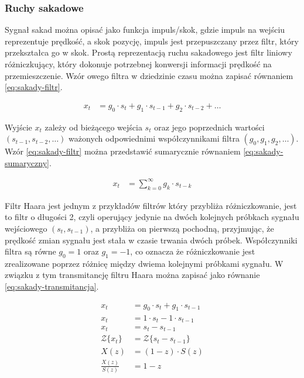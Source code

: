 \documentclass[a4paper,twoside,12pt]{book}
\begin{document}
\subsubsection{Ruchy sakadowe}
\label{subsubsec:ruchy-sakadowe}

Sygnał sakad można opisać jako funkcja impuls/skok, gdzie impuls na wejściu reprezentuje prędkość, a skok pozycję, impuls jest przepuszczany przez filtr, który przekształca go w skok. Prostą reprezentacją ruchu sakadowego jest filtr liniowy różniczkujący, który dokonuje potrzebnej konwersji informacji prędkość na przemieszczenie. Wzór owego filtra w dziedzinie czasu można zapisać równaniem \ref{eq:sakady-filtr}.

\begin{align}
	x_t &= g_0 \cdot s_t + g_1 \cdot s_{t-1} + g_2 \cdot s_{t-2} + \ldots
	\label{eq:sakady-filtr}
\end{align}

Wyjście $x_t$ zależy od bieżącego wejścia $s_t$ oraz jego poprzednich wartości $(s_{t-1}, s_{t-2}, \ldots)$ ważonych odpowiednimi współczynnikami filtra $(g_0, g_1, g_2, \ldots)$. Wzór \ref{eq:sakady-filtr} można przedstawić sumarycznie równaniem \ref{eq:sakady-sumaryczny}.

\begin{align}
	x_t &= \sum_{k=0}^{\infty} g_k \cdot s_{t-k}
	\label{eq:sakady-sumaryczny}
\end{align}

Filtr Haara jest jednym z przykładów filtrów który przybliża różniczkowanie, jest to filtr o długości 2, czyli operujący jedynie na dwóch kolejnych próbkach sygnału wejściowego $(s_t, s_{t-1})$, a przybliża on pierwszą pochodną, przyjmując, że prędkość zmian sygnału jest stała w czasie trwania dwóch próbek. Współczynniki filtra są równe $g_0 = 1$ oraz $g_1 = -1$, co oznacza że różniczkowanie jest zrealizowane poprzez różnicę między dwiema kolejnymi próbkami sygnału. W związku z tym transmitancję filtru Haara można zapisać jako równanie \ref{eq:sakady-transmitancja}.

\begin{align} %
	x_t &= g_0 \cdot s_t + g_1 \cdot s_{t-1} \nonumber \\
	x_t &= 1 \cdot s_t - 1 \cdot s_{t-1} \nonumber \\
	x_t &= s_t - s_{t-1} \nonumber \\
	\mathcal{Z}\{x_t\} &= \mathcal{Z} \{s_t - s_{t-1}\} \nonumber \\
	X(z) &= (1 - z) \cdot S(z) \nonumber \\ %
	\frac{X(z)}{S(z)} &= 1 - z \label{eq:sakady-transmitancja}
\end{align}   %
\end{document}
